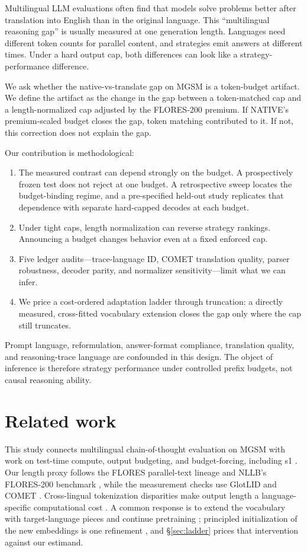 \documentclass[11pt]{article}
\begin{document}
Multilingual LLM evaluations often find that models solve problems better after translation into English than in the original language. This ``multilingual reasoning gap'' is usually measured at one generation length. Languages need different token counts for parallel content, and strategies emit answers at different times. Under a hard output cap, both differences can look like a strategy-performance difference.

We ask whether the native-vs-translate gap on MGSM is a token-budget artifact. We define the artifact as the change in the gap between a token-matched cap and a length-normalized cap adjusted by the FLORES-200 premium. If NATIVE's premium-scaled budget closes the gap, token matching contributed to it. If not, this correction does not explain the gap.

Our contribution is methodological:
\begin{enumerate}
    \item The measured contrast can depend strongly on the budget. A prospectively frozen test does not reject at one budget. A retrospective sweep locates the budget-binding regime, and a pre-specified held-out study replicates that dependence with separate hard-capped decodes at each budget.
    \item Under tight caps, length normalization can reverse strategy rankings. Announcing a budget changes behavior even at a fixed enforced cap.
    \item Five ledger audits---trace-language ID, COMET translation quality, parser robustness, decoder parity, and normalizer sensitivity---limit what we can infer.
    \item We price a cost-ordered adaptation ladder through truncation: a directly measured, cross-fitted vocabulary extension closes the gap only where the cap still truncates.
\end{enumerate}

Prompt language, reformulation, answer-format compliance, translation quality, and reasoning-trace language are confounded in this design. The object of inference is therefore strategy performance under controlled prefix budgets, not causal reasoning ability.

\section{Related work}
\label{sec:related}

This study connects multilingual chain-of-thought evaluation on MGSM \citep{mgsm} with work on test-time compute, output budgeting, and budget-forcing, including s1 \citep{s1budget}. Our length proxy follows the FLORES parallel-text lineage and NLLB's FLORES-200 benchmark \citep{flores101,nllb}, while the measurement checks use GlotLID \citep{glotlid} and COMET \citep{comet22}. Cross-lingual tokenization disparities make output length a language-specific computational cost \citep{ahia2023,petrov2023}. A common response is to extend the vocabulary with target-language pieces and continue pretraining \citep{chinesellama,swallow}; principled initialization of the new embeddings is one refinement \citep{focus}, and \S\ref{sec:ladder} prices that intervention against our estimand.
\end{document}
